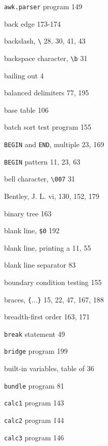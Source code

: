 \begin{multicols}{3}
\hangindent=4pc  \verb'awk.parser' program 149

\hangindent=4pc  back edge 173-174

\hangindent=4pc  backslash, \verb'\' 28, 30, 41, 43

\hangindent=4pc  backspace character, \verb'\b' 31

\hangindent=4pc  bailing out 4

\hangindent=4pc  balanced delimiters 77, 195

\hangindent=4pc  base table 106

\hangindent=4pc  batch sort test program 155

\hangindent=4pc  \verb'BEGIN' and \verb'END', multiple 23, 169

\hangindent=4pc  \verb'BEGIN' pattern 11, 23, 63

\hangindent=4pc  bell character, \verb'\007' 31

\hangindent=4pc  Bentley, J. L. vi, 130, 152, 179

\hangindent=4pc  binary tree 163

\hangindent=4pc  blank line, \verb'$0' 192

\hangindent=4pc  blank line, printing a 11, 55

\hangindent=4pc  blank line separator 83

\hangindent=4pc  boundary condition testing 155

\hangindent=4pc  braces, \verb'{'...\verb'}' 15, 22, 47, 167, 188

\hangindent=4pc  breadth-first order 163, 171

\hangindent=4pc  \verb'break' statement 49

\hangindent=4pc  \verb'bridge' program 199

\hangindent=4pc  built-in variables, table of 36

\hangindent=4pc  \verb'bundle' program 81

\hangindent=4pc  \verb'calc1' program 143

\hangindent=4pc  \verb'calc2' program 144

\hangindent=4pc  \verb'calc3' program 146


\end{multicols}
